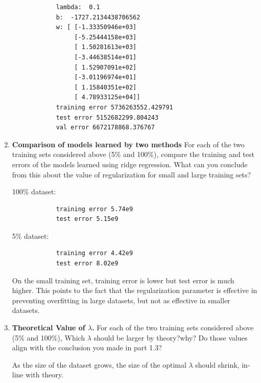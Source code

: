 \begin{enumerate}
        \begin{verbatim}
            lambda:  0.1  
            b:  -1727.2134438706562
            w: [ [-1.33350946e+03]
                 [-5.25444158e+03]
                 [ 1.50281613e+03]
                 [-3.44638514e+01]
                 [ 1.52907091e+02]
                 [-3.01196974e+01]
                 [ 1.15840351e+02]
                 [ 4.78933125e+04]]
            training error 5736263552.429791
            test error 5152682299.804243
            val error 6672178868.376767
        \end{verbatim}
        
        
        \item \textbf{Comparison of models learned by two methods}  For each of the two training sets considered above (5$\%$ and 100$\%$), compare the training and test errors of the models learned using ridge regression. What can you conclude from this about the value of regularization for small and large training sets?
        
        100\% dataset:
        \begin{verbatim}
            training error 5.74e9
            test error 5.15e9
        \end{verbatim}
        
        5\% dataset:
        \begin{verbatim}
            training error 4.42e9
            test error 8.02e9
        \end{verbatim}
        
        On the small training set, training error is lower but test error is much higher. This points to the fact that the regularization parameter is effective in preventing overfitting in large datasets, but not as effective in smaller datasets.
        
        \item \textbf{Theoretical Value of $\lambda$.} For each of the two training sets considered above (5$\%$ and 100$\%$), Which $\lambda$ should be larger by theory?why? Do those values align with the conclusion you made in part 1.3?
        
        As the size of the dataset grows, the size of the optimal $\lambda$ should shrink, in-line with theory.
    
    \end{enumerate}